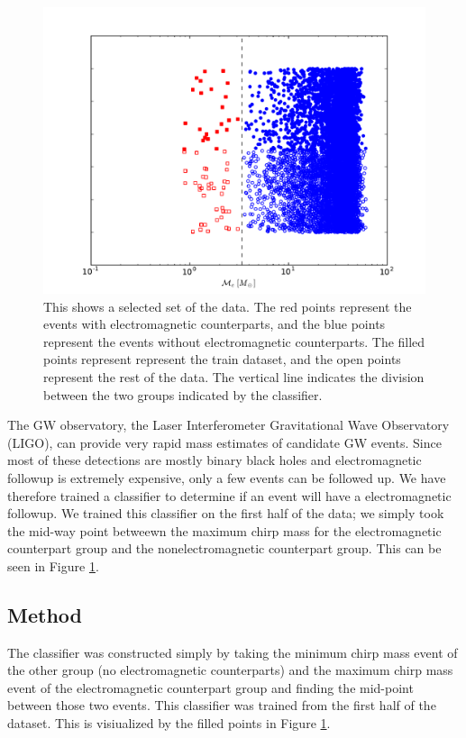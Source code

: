 \begin{figure}[ht]
  \includegraphics[width=\columnwidth]{img/output/classifier_comparison}
  \caption{This shows a selected set of the data. The red points represent the events with electromagnetic counterparts, and the blue points represent the events without electromagnetic counterparts. The filled points represent represent the train dataset, and the open points represent the rest of the data. The vertical line indicates the division between the two groups indicated by the classifier.}
  \label{fig:class}
\end{figure}

The GW observatory, the Laser Interferometer Gravitational Wave Observatory (LIGO), can provide very rapid mass estimates of candidate GW events. Since most of these detections are mostly binary black holes and electromagnetic followup is extremely expensive, only a few events can be followed up. We have therefore trained a classifier to determine if an event will have a electromagnetic followup. We trained this classifier on the first half of the data; we simply took the mid-way point betweewn the maximum chirp mass for the electromagnetic counterpart group and the nonelectromagnetic counterpart group. This can be seen in Figure \ref{fig:class}.


\subsection{Method}
The classifier was constructed simply by taking the minimum chirp mass event of the other group (no electromagnetic counterparts) and the maximum chirp mass event of the electromagnetic counterpart group and finding the mid-point between those two events. This classifier was trained from the first half of the dataset. This is visiualized by the filled points in Figure \ref{fig:class}.

